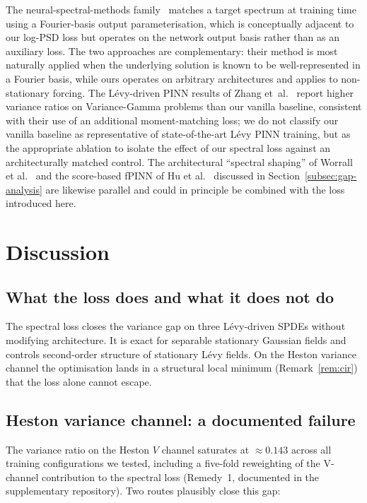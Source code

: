 \documentclass[review,12pt]{elsarticle}
\begin{document}
The neural-spectral-methods family~\cite{DuEtAl2024NSM} matches a
target spectrum at training time using a Fourier-basis output
parameterisation, which is conceptually adjacent to our log-PSD
loss but operates on the network output basis rather than as an
auxiliary loss. The two approaches are complementary: their
method is most naturally applied when the underlying solution is
known to be well-represented in a Fourier basis, while ours
operates on arbitrary architectures and applies to non-stationary
forcing. The L\'evy-driven PINN results of Zhang
et~al.~\cite{ZhangEtAl2025LevyPINN} report higher variance ratios
on Variance-Gamma problems than our vanilla baseline, consistent
with their use of an additional moment-matching loss; we do not
classify our vanilla baseline as representative of
state-of-the-art L\'evy PINN training, but as the appropriate
ablation to isolate the effect of our spectral loss against an
architecturally matched control. The architectural ``spectral
shaping'' of Worrall et al.~\cite{Worrall2025SpectralShaping} and
the score-based fPINN of Hu et al.~\cite{Hu2024ScoreFPINN}
discussed in Section~\ref{subsec:gap-analysis} are likewise
parallel and could in principle be combined with the loss
introduced here.

\section{Discussion}
\label{sec:discussion}

\subsection{What the loss does and what it does not do}

The spectral loss closes the variance gap on three L\'evy-driven SPDEs without modifying architecture. It is exact for separable stationary Gaussian fields and controls second-order structure of stationary L\'evy fields. On the Heston variance channel the optimisation lands in a structural local minimum (Remark~\ref{rem:cir}) that the loss alone cannot escape.

\subsection{Heston variance channel: a documented failure}

The variance ratio on the Heston \(V\) channel saturates at
\(\approx 0.143\) across all training configurations we tested,
including a five-fold reweighting of the V-channel contribution
to the spectral loss (Remedy~1, documented in the supplementary
repository). Two routes plausibly close this gap:
\end{document}
